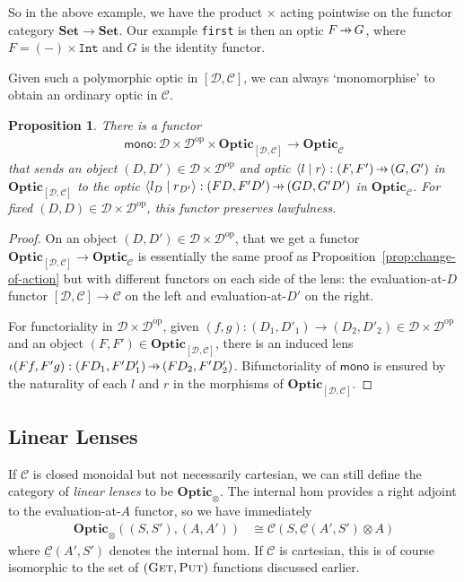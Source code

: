 \documentclass[11pt,letterpaper]{article}
\theoremstyle{plain}
\newtheorem{proposition}[theorem]{Proposition}
\theoremstyle{definition}
\newtheorem{remark}[theorem]{Remark}
\newcommand{\C}{\mathscr{C}}
\newcommand{\homC}{\underline{\C}}
\newcommand{\D}{\mathscr{D}}
\newcommand{\Set}{\mathbf{Set}}
\newcommand{\Optic}{\mathbf{Optic}}
\newcommand{\op}{\mathrm{op}}
\newcommand{\rep}[2]{{\ensuremath \left\langle #1 \mid #2 \right\rangle}}
\newcommand{\fget}{\textsc{Get}}
\newcommand{\fput}{\textsc{Put}}
\newcommand{\hto}{\ensuremath{\,\mathaccent\shortmid\rightarrow\,}}
\newcommand{\todo}[1]{\textcolor{red}{\small #1}}
\begin{document}
So in the above example, we have the product $\times$ acting pointwise on the functor category $\Set \to \Set$. Our example \texttt{first} is then an optic $F \hto G$, where $F = (-) \times \texttt{Int}$ and $G$ is the identity functor.

Given such a polymorphic optic in $[\D, \C]$, we can always `monomorphise' to obtain an ordinary optic in $\C$.
\begin{proposition}
  There is a functor
  \begin{align*}
    \mathsf{mono} : \D \times \D^\op \times \Optic_{[\D, \C]} \to \Optic_\C
  \end{align*}
  that sends an object $(D, D') \in \D \times \D^\op$ and optic $\rep{l}{r} : (F, F') \hto (G, G')$ in $\Optic_{[\D, \C]}$ to the optic $\rep{l_D}{r_{D'}} : (FD, F'D') \hto (GD, G'D')$ in $\Optic_\C$. For fixed $(D, D) \in \D \times \D^\op$, this functor preserves lawfulness.
\end{proposition}
\begin{proof}
  On an object $(D, D') \in \D \times \D^\op$, that we get a functor $\Optic_{[\D, \C]} \to \Optic_\C$ is essentially the same proof as Proposition~\ref{prop:change-of-action} but with different functors on each side of the lens: the evaluation-at-$D$ functor $[\D, \C] \to \C$ on the left and evaluation-at-$D'$ on the right.

  For functoriality in $\D \times \D^\op$, given $(f, g) : (D_1, D'_1) \to (D_2, D'_2) \in \D \times \D^\op$ and an object $(F, F') \in \Optic_{[\D, \C]}$, there is an induced lens $\iota(Ff, F'g) : (FD_1, F'D'_1) \hto (FD_2, F'D'_2)$. Bifunctoriality of $\mathsf{mono}$ is ensured by the naturality of each $l$ and $r$ in the morphisms of $\Optic_{[\D, \C]}$.
\end{proof}



\subsection{Linear Lenses}\label{sec:linear-lenses}
\newcommand{\ev}{\mathsf{ev}}
\newcommand{\coev}{\mathsf{coev}}

If $\C$ is closed monoidal but not necessarily cartesian, we can still define the category of \emph{linear lenses} to be $\Optic_\otimes$. The internal hom provides a right adjoint to the evaluation-at-$A$ functor, so we have immediately
\begin{align*}
  \Optic_\otimes((S, S'), (A, A')) &\cong \C(S, \homC(A',S') \otimes A)
\end{align*}
where $\homC(A', S')$ denotes the internal hom. If $\C$ is cartesian, this is of course isomorphic to the set of $(\fget, \fput)$ functions discussed earlier.
\end{document}
